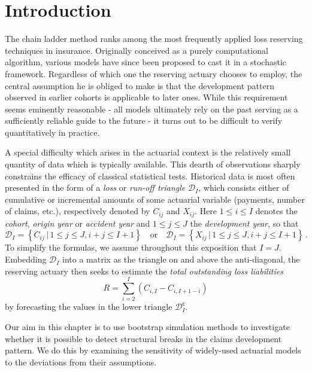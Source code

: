 \documentclass[a4paper]{book}
\theoremstyle{plain}
\begin{document}
\section{Introduction}

The chain ladder method ranks among the most frequently applied loss reserving techniques in insurance. Originally conceived as a purely computational algorithm, various models have since been proposed to cast it in a stochastic framework. Regardless of which one the reserving actuary chooses to employ, the central assumption he is obliged to make is that the development pattern observed in earlier cohorts is applicable to later ones. While this requirement seems eminently reasonable - all models ultimately rely on the past serving as a sufficiently reliable guide to the future - it turns out to be difficult to verify quantitatively in practice. 

A special difficulty which arises in the actuarial context is the relatively small quantity of data which is typically available. This dearth of observations sharply constrains the efficacy of classical statistical tests. Historical data is most often presented in the form of a \emph{loss} or \emph{run-off triangle} $\mathcal{D}_I$, which consists either of cumulative or incremental amounts of some actuarial variable (payments, number of claims, etc.), respectively denoted by $C_{ij}$ and $X_{ij}$. Here $1 \leq i \leq I$ denotes the \emph{cohort}, \emph{origin year} or \emph {accident year} and $1 \leq j \leq J$ the \emph{development year}, so that
\begin{equation}
    \mathcal{D}_I = \left\lbrace C_{ij} \, \vert \, 1 \leq j \leq J, i + j \leq I + 1 \right \rbrace 
    \quad \text{or} \quad 
    \mathcal{D}_I = \left\lbrace X_{ij} \, \vert \, 1 \leq j \leq J, i + j \leq I + 1 \right \rbrace \,.
\end{equation}
To simplify the formulas, we assume throughout this exposition that $I = J$. Embedding $\mathcal{D}_I$ into a matrix as the triangle on and above the anti-diagonal, the reserving actuary then seeks to estimate the \emph{total outstanding loss liabilities}
\begin{equation}
    R = \sum_{i = 2}^I (C_{i, I} - C_{i, I + 1- i})
\end{equation}
by forecasting the values in the lower triangle $\mathcal{D}^{\mathsf{c}}_I$. 

Our aim in this chapter is to use bootstrap simulation methods to investigate whether it is possible to detect structural breaks in the claims development pattern. We do this by examining the sensitivity of widely-used actuarial models to the deviations from their assumptions.  
\end{document}
